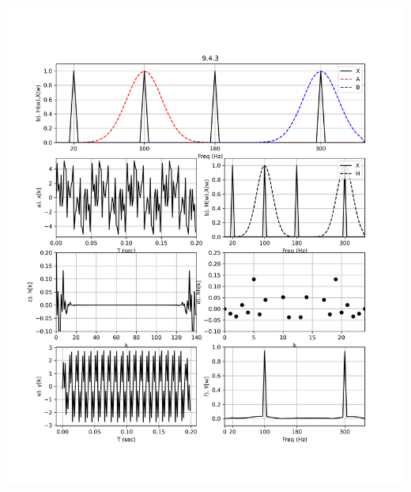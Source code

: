 \documentclass[12pt,a4paper]{article}
\begin{document}
\begin{center}
	\includegraphics[height = 9in]{9.4.3.png} 
	\newpage

\end{center}
\end{document}
